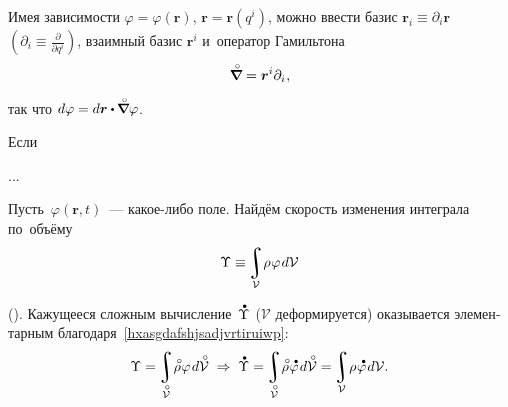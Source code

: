 

\label{para:differentiation}

\begin{otherlanguage}{russian}

Имея зависимости ${\varphi \!=\! \varphi(\bm{r})}$, ${\bm{r} \!=\! \bm{r}(q^{i})}$, можно ввести базис ${\bm{r}_i \equiv \partial_i \bm{r}}$~${(\partial_i \equiv \frac{\partial}{\partial q^i})}$, взаимный базис ${\bm{r}^i}$ и~оператор Гамильтона
\vspace{-0.12em}\begin{equation}
\boldnablacircled = \bm{r}^i \partial_i \hspace{0.1ex},
\end{equation}

\vspace{-0.8em}\noindent так что ${d\varphi = d\bm{r} \dotp \hspace{-0.1ex} \boldnablacircled \varphi}$.

Если

...



Пусть~${\varphi(\bm{r},t)}$~--- какое\hbox{-}либо поле. Найдём скорость изменения интеграла по~объёму
\[ \Upsilon \equiv \hspace{-0.2ex} \integral\displaylimits_{\mathcal{V}} \! \rho \hspace{0.1ex} \varphi \hspace{0.2ex} d\mathcal{V} \]

\vspace{-0.25em}\noindent (). Кажущееся сложным вычисление~${\mathdotabove{\Upsilon}}$ ($\mathcal{V}$ деформируется) оказывается элементарным благодаря~\eqref{hxasgdafshjsadjvrtiruiwp}:
\begin{equation}\label{volumeintegralinbothconfigurations}
\Upsilon = \hspace{-0.2ex} \integral\displaylimits_{\mathcircabove{\mathcal{V}}} \! \mathcircabove{\rho} \hspace{0.1ex} \varphi \hspace{0.2ex} d\mathcircabove{\mathcal{V}} 
\;\Rightarrow\;
\mathdotabove{\Upsilon} = \hspace{-0.2ex} \integral\displaylimits_{\mathcircabove{\mathcal{V}}} \! \mathcircabove{\rho} \hspace{0.1ex} \mathdotabove{\varphi} \hspace{0.2ex} d\mathcircabove{\mathcal{V}} =
\hspace{-0.2ex} \integral\displaylimits_{\mathcal{V}} \! \rho \hspace{0.1ex} \mathdotabove{\varphi} \hspace{0.2ex} d\mathcal{V} .
\end{equation}


\end{otherlanguage}
